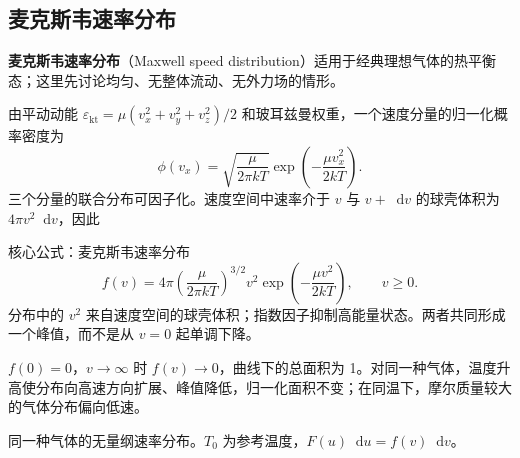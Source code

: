 \documentclass[UTF8,fontset=none,zihao=-4,a4paper]{ctexart}
\newcommand{\term}[1]{\textbf{#1}}
\newcommand{\dd}{\mathop{}\!\mathrm{d}}
\begin{document}
\subsection{麦克斯韦速率分布}
\term{麦克斯韦速率分布}（Maxwell speed distribution）适用于经典理想气体的热平衡态；这里先讨论均匀、无整体流动、无外力场的情形。

由平动动能 $\varepsilon_{\mathrm{kt}}=\mu(v_x^2+v_y^2+v_z^2)/2$ 和玻耳兹曼权重，一个速度分量的归一化概率密度为
\[
 \phi(v_x)=\sqrt{\frac{\mu}{2\pi kT}}
 \exp\left(-\frac{\mu v_x^2}{2kT}\right).
\]
三个分量的联合分布可因子化。速度空间中速率介于 $v$ 与 $v+\dd v$ 的球壳体积为 $4\pi v^2\dd v$，因此
\begin{infobox}{核心公式：麦克斯韦速率分布}
\[
 f(v)=4\pi\left(\frac{\mu}{2\pi kT}\right)^{3/2}
 v^2\exp\left(-\frac{\mu v^2}{2kT}\right),\qquad v\ge0.
\]
分布中的 $v^2$ 来自速度空间的球壳体积；指数因子抑制高能量状态。两者共同形成一个峰值，而不是从 $v=0$ 起单调下降。
\end{infobox}
$f(0)=0$，$v\to\infty$ 时 $f(v)\to0$，曲线下的总面积为 1。对同一种气体，温度升高使分布向高速方向扩展、峰值降低，归一化面积不变；在同温下，摩尔质量较大的气体分布偏向低速。

\begin{center}
\par\small 同一种气体的无量纲速率分布。$T_0$ 为参考温度，$F(u)\dd u=f(v)\dd v$。
\end{center}
\end{document}
